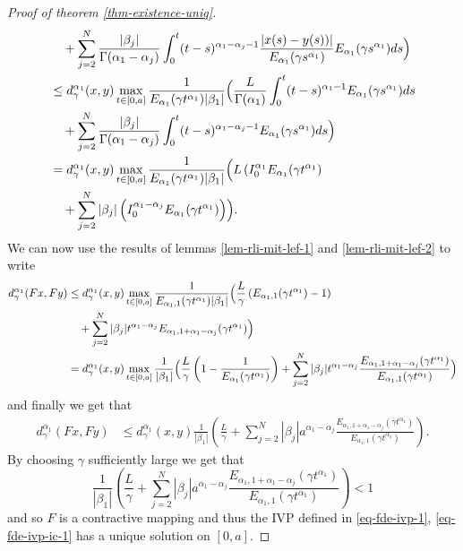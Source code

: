 \begin{proof}[Proof of theorem \ref{thm-existence-uniq}]
\begin{align*}
			& \ \ \ + \sum_{j=2}^N \frac{|\beta_j|}{\Gamma(\alpha_1 - \alpha_j)} \int_0^t (t-s)^{\alpha_1 - \alpha_j - 1}\frac{|x(s) - y(s))|}{E_{\alpha_1}(\gamma s^{\alpha_1})}E_{\alpha_1}(\gamma s^{\alpha_1}) ds \Bigr) \\
			&\leq d_\gamma^{\alpha_1}(x,y) \max_{t \in [0, a]} \frac{1}{E_{\alpha_1}(\gamma t^{\alpha_1})|\beta_1|} \Bigl(
			\frac{L}{\Gamma(\alpha_1)}\int_0^t (t-s)^{\alpha_1 - 1} E_{\alpha_1}(\gamma s^{\alpha_1}) ds \\
			& \ \ \ + \sum_{j=2}^N \frac{|\beta_j|}{\Gamma(\alpha_1 - \alpha_j)} \int_0^t (t-s)^{\alpha_1 - \alpha_j - 1}E_{\alpha_1}(\gamma s^{\alpha_1}) ds \Bigr) \\
			&= d_\gamma^{\alpha_1}(x,y) \max_{t \in [0, a]} \frac{1}{E_{\alpha_1}(\gamma t^{\alpha_1})|\beta_1|} \Bigl(
			L \left( I_{0}^{\alpha_1} E_{\alpha_1}(\gamma t^{\alpha_1} \right) \\
			& \ \ \ + \sum_{j=2}^N |\beta_j| \left( I_{0}^{\alpha_1 - \alpha_j} E_{\alpha_1}(\gamma t^{\alpha_1}) \right) \Bigr). \\
	\end{align*}
	We can now use the results of lemmas \ref{lem-rli-mit-lef-1} and \ref{lem-rli-mit-lef-2} to write
	\begin{align*}
		d_\gamma^{\alpha_1}(Fx,Fy) &\leq d_\gamma^{\alpha_1}(x,y) \max_{t \in [0, a]} \frac{1}{E_{\alpha_1, 1}(\gamma t^{\alpha_1})|\beta_1|} \Bigl(
			\frac{L}{\gamma}\left( E_{\alpha_1,1}(\gamma t^{\alpha_1}) - 1 \right) \\
			& \ \ \ + \sum_{j=2}^N |\beta_j| t^{\alpha_1 - \alpha_j} E_{\alpha_1, 1 + \alpha_1 - \alpha_j}(\gamma t^{\alpha_1}) \Bigr) \\
			&= d_\gamma^{\alpha_1}(x,y) \max_{t \in [0, a]} \frac{1}{|\beta_1|} \Bigl(
			\frac{L}{\gamma}\left( 1- \frac{1}{E_{\alpha_1}(\gamma t^{\alpha_1})} \right) + \sum_{j=2}^N |\beta_j| t^{\alpha_1 - \alpha_j}\frac{E_{\alpha_1,1+\alpha_1-\alpha_j}(\gamma t^{\alpha_1})}{E_{\alpha_1,1}(\gamma t^{\alpha_1})}\Bigr) \\
	\end{align*}
	and finally we get that 
	\begin{align*}
		d_\gamma^{\alpha_1}(Fx,Fy) &\leq d_\gamma^{\alpha_1}(x,y) \frac{1}{|\beta_1|}\left( \frac{L}{\gamma} + \sum_{j=2}^N |\beta_j| a^{\alpha_1 - \alpha_j} \frac{E_{\alpha_1,1+\alpha_1-\alpha_j}(\gamma t^{\alpha_1})}{E_{\alpha_1,1}(\gamma t^{\alpha_1})} \right).
	\end{align*}
	By choosing $ \gamma $ sufficiently large we get that 
	$$
		\frac{1}{|\beta_1|}\left( \frac{L}{\gamma} + \sum_{j=2}^N |\beta_j| a^{\alpha_1 - \alpha_j} \frac{E_{\alpha_1,1+\alpha_1-\alpha_j}(\gamma t^{\alpha_1})}{E_{\alpha_1,1}(\gamma t^{\alpha_1})} \right) < 1
	$$
	and so $ F $ is a contractive mapping and thus the IVP defined in \eqref{eq-fde-ivp-1}, \eqref{eq-fde-ivp-ic-1} has a unique solution on $ [0, a] $.
\end{proof}

